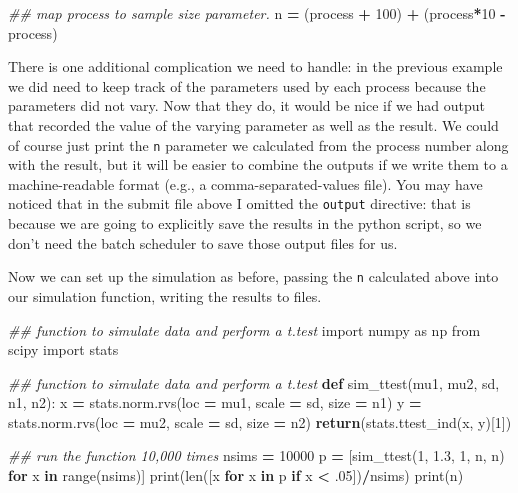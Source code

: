 \documentclass[
]{book}
\newenvironment{Shaded}{\begin{snugshade}}{\end{snugshade}}
\newcommand{\BuiltInTok}[1]{#1}
\newcommand{\CommentTok}[1]{\textcolor[rgb]{0.56,0.35,0.01}{\textit{#1}}}
\newcommand{\ControlFlowTok}[1]{\textcolor[rgb]{0.13,0.29,0.53}{\textbf{#1}}}
\newcommand{\DecValTok}[1]{\textcolor[rgb]{0.00,0.00,0.81}{#1}}
\newcommand{\FloatTok}[1]{\textcolor[rgb]{0.00,0.00,0.81}{#1}}
\newcommand{\ImportTok}[1]{#1}
\newcommand{\KeywordTok}[1]{\textcolor[rgb]{0.13,0.29,0.53}{\textbf{#1}}}
\newcommand{\NormalTok}[1]{#1}
\newcommand{\OperatorTok}[1]{\textcolor[rgb]{0.81,0.36,0.00}{\textbf{#1}}}
\begin{document}
\begin{enumerate}
\begin{Shaded}
\begin{Highlighting}[]
\CommentTok{\#\# map process to sample size parameter.}
\NormalTok{n }\OperatorTok{=}\NormalTok{ (process }\OperatorTok{+} \DecValTok{100}\NormalTok{) }\OperatorTok{+}\NormalTok{ (process}\OperatorTok{*}\DecValTok{10} \OperatorTok{{-}}\NormalTok{ process)}
\end{Highlighting}
\end{Shaded}

  There is one additional complication we need to handle: in the
  previous example we did need to keep track of the parameters used by
  each process because the parameters did not vary. Now that they do,
  it would be nice if we had output that recorded the value of the
  varying parameter as well as the result. We could of course just
  print the \texttt{n} parameter we calculated from the process number along
  with the result, but it will be easier to combine the outputs if we
  write them to a machine-readable format (e.g., a
  comma-separated-values file). You may have noticed that in the
  submit file above I omitted the \texttt{output} directive: that is because
  we are going to explicitly save the results in the python script, so
  we don't need the batch scheduler to save those output files for us.

  Now we can set up the simulation as before, passing the \texttt{n}
  calculated above into our simulation function, writing the results
  to files.

\begin{Shaded}
\begin{Highlighting}[]
\CommentTok{\#\# function to simulate data and perform a t.test}
\ImportTok{import}\NormalTok{ numpy }\ImportTok{as}\NormalTok{ np}
\ImportTok{from}\NormalTok{ scipy }\ImportTok{import}\NormalTok{ stats}

\CommentTok{\#\# function to simulate data and perform a t.test}
\KeywordTok{def}\NormalTok{ sim\_ttest(mu1, mu2, sd, n1, n2):}
\NormalTok{    x }\OperatorTok{=}\NormalTok{ stats.norm.rvs(loc }\OperatorTok{=}\NormalTok{ mu1, scale }\OperatorTok{=}\NormalTok{ sd, size }\OperatorTok{=}\NormalTok{ n1)}
\NormalTok{    y }\OperatorTok{=}\NormalTok{ stats.norm.rvs(loc }\OperatorTok{=}\NormalTok{ mu2, scale }\OperatorTok{=}\NormalTok{ sd, size }\OperatorTok{=}\NormalTok{ n2)}
    \ControlFlowTok{return}\NormalTok{(stats.ttest\_ind(x, y)[}\DecValTok{1}\NormalTok{])}

\CommentTok{\#\#  run the function 10,000 times}
\NormalTok{nsims }\OperatorTok{=} \DecValTok{10000}
\NormalTok{p }\OperatorTok{=}\NormalTok{ [sim\_ttest(}\DecValTok{1}\NormalTok{, }\FloatTok{1.3}\NormalTok{, }\DecValTok{1}\NormalTok{, n, n)  }\ControlFlowTok{for}\NormalTok{ x }\KeywordTok{in} \BuiltInTok{range}\NormalTok{(nsims)]}
\BuiltInTok{print}\NormalTok{(}\BuiltInTok{len}\NormalTok{([x }\ControlFlowTok{for}\NormalTok{ x }\KeywordTok{in}\NormalTok{ p }\ControlFlowTok{if}\NormalTok{ x }\OperatorTok{\textless{}} \FloatTok{.05}\NormalTok{])}\OperatorTok{/}\NormalTok{nsims)}
\BuiltInTok{print}\NormalTok{(n)}
\end{Highlighting}
\end{Shaded}


\end{enumerate}
\end{document}

